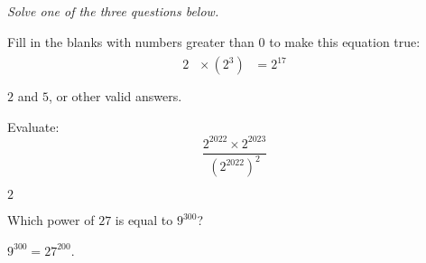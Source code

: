 \documentclass{quiz}
\begin{document}
\emph{Solve one of the three questions below.}

\begin{questions}
\question Fill in the blanks with numbers greater than 0 to make this equation true: \marginpar{\llap{[2]}}
$$ 2^{\boxed{\phantom{2^2}}} \times \left( 2^3 \right)^{\boxed{\phantom{2^2}}} = 2^{17} $$
\begin{answers}
$2$ and $5$, or other valid answers. 
\end{answers}

\question Evaluate: \marginpar{\llap{[3]}}
$$ \frac{2^{2022} \times 2^{2023} }{\left( 2^{2022} \right)^2 } $$ 
\begin{answers}
$2$
\end{answers}

\question Which power of $27$ is equal to $9^{300}$? 
\begin{answers}
$9^{300}=27^{200}$. 
\end{answers}

\end{questions}

\showallanswers
\end{document}
